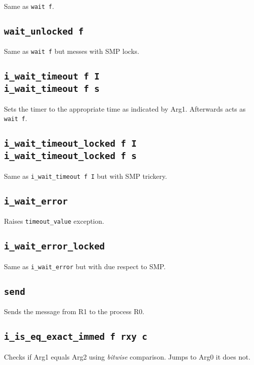 \documentclass{article}
\newcommand{\iop}[1]{\texttt{#1}}
\begin{document}
Same as \iop{wait f}.

\subsection*{\iop{wait\_unlocked f}}

Same as \iop{wait f} but messes with SMP locks.

\subsection*{\iop{i\_wait\_timeout f I}\\
\iop{i\_wait\_timeout f s}}

Sets the timer to the appropriate time as indicated by Arg1. Afterwards acts as
\iop{wait f}.

\subsection*{\iop{i\_wait\_timeout\_locked f I}\\
\iop{i\_wait\_timeout\_locked f s}}

Same as \iop{i\_wait\_timeout f I} but with SMP trickery.

\subsection*{\iop{i\_wait\_error}}

Raises \verb$timeout_value$ exception.

\subsection*{\iop{i\_wait\_error\_locked}}

Same as \iop{i\_wait\_error} but with due respect to SMP.

\subsection*{\iop{send}}

Sends the message from R1 to the process R0.

\subsection*{\iop{i\_is\_eq\_exact\_immed f rxy c}}

Checks if Arg1 equals Arg2 using \emph{bitwise} comparison. Jumps to Arg0 it
does not.
\end{document}
